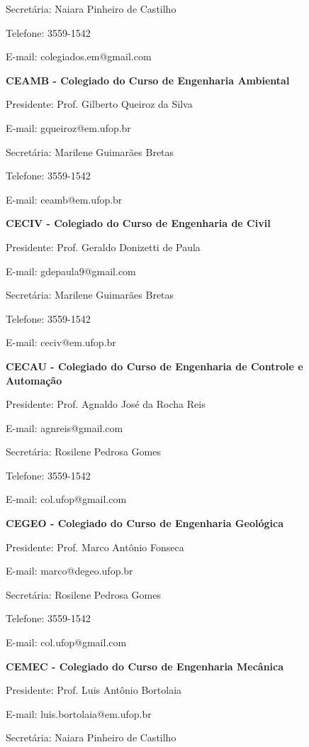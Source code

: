 Secretária: Naiara Pinheiro de Castilho

Telefone: 3559-1542

E-mail: colegiados.em@gmail.com



\textbf{CEAMB - Colegiado do Curso de Engenharia Ambiental}

Presidente: Prof. Gilberto Queiroz da Silva

E-mail: gqueiroz@em.ufop.br

Secretária: Marilene Guimarães Bretas

Telefone: 3559-1542

E-mail: ceamb@em.ufop.br



\textbf{CECIV - Colegiado do Curso de Engenharia de Civil}

Presidente: Prof. Geraldo Donizetti de Paula

E-mail: gdepaula9@gmail.com

Secretária: Marilene Guimarães Bretas

Telefone: 3559-1542

E-mail: ceciv@em.ufop.br



\textbf{CECAU - Colegiado do Curso de Engenharia de Controle e Automação}

Presidente: Prof. Agnaldo José da Rocha Reis

E-mail: agnreis@gmail.com

Secretária: Rosilene Pedrosa Gomes

Telefone: 3559-1542

E-mail: col.ufop@gmail.com



\textbf{CEGEO - Colegiado do Curso de Engenharia Geológica}

Presidente: Prof. Marco Antônio Fonseca

E-mail: marco@degeo.ufop.br

Secretária: Rosilene Pedrosa Gomes

Telefone: 3559-1542

E-mail: col.ufop@gmail.com



\textbf{CEMEC - Colegiado do Curso de Engenharia Mecânica}

Presidente: Prof. Luis Antônio Bortolaia

E-mail: luis.bortolaia@em.ufop.br

Secretária: Naiara Pinheiro de Castilho

